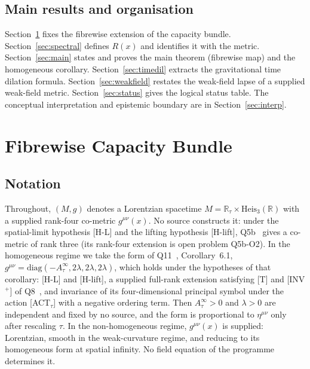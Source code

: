 \documentclass[11pt,a4paper]{article}
\begin{document}
  \subsection{Main results and organisation}\label{sec:org}

  Section~\ref{sec:setup} fixes the fibrewise extension of the capacity bundle.
  Section~\ref{sec:spectral} defines $R(x)$ and identifies it with the metric.
  Section~\ref{sec:main} states and proves the main theorem (fibrewise map) and the
  homogeneous corollary.
  Section~\ref{sec:timedil} extracts the gravitational time dilation formula.
  Section~\ref{sec:weakfield} restates the weak-field lapse of a supplied weak-field metric.
  Section~\ref{sec:status} gives the logical status table.
  The conceptual interpretation and epistemic boundary are in Section~\ref{sec:interp}.

  \section{Fibrewise Capacity Bundle}\label{sec:setup}

  \subsection{Notation}

    Throughout, $(M, g)$ denotes a Lorentzian spacetime $M = \mathbb{R}_\tau
  \times \mathrm{Heis}_3(\mathbb{R})$ with a supplied rank-four co-metric $g^{\mu\nu}(x)$.
    No source constructs it: under the spatial-limit hypothesis [H-L] and the lifting hypothesis [H-lift],
    Q5b~\cite{Beau2026q5b} gives a co-metric of rank three (its rank-four extension is open problem Q5b-O2).
    In the homogeneous regime we take the form of Q11~\cite{Beau2026q11}, Corollary~6.1,
    $g^{\mu\nu} = \mathrm{diag}(-A_\tau^\infty, 2\lambda, 2\lambda, 2\lambda)$, which holds under the hypotheses of
    that corollary: [H-L] and [H-lift], a supplied full-rank extension satisfying [T] and [INV$^+$] of
    Q8~\cite{BeauQ8}, and invariance of its four-dimensional principal symbol under the action [ACT$_\tau$] with a
    negative ordering term.
    Then $A_\tau^\infty > 0$ and $\lambda > 0$ are independent and fixed by no source, and the form is proportional
    to $\eta^{\mu\nu}$ only after rescaling $\tau$.
    In the non-homogeneous regime, $g^{\mu\nu}(x)$ is supplied: Lorentzian,
    smooth in the weak-curvature regime, and reducing to its homogeneous form at spatial infinity.
    No field equation of the programme determines it.
\end{document}
